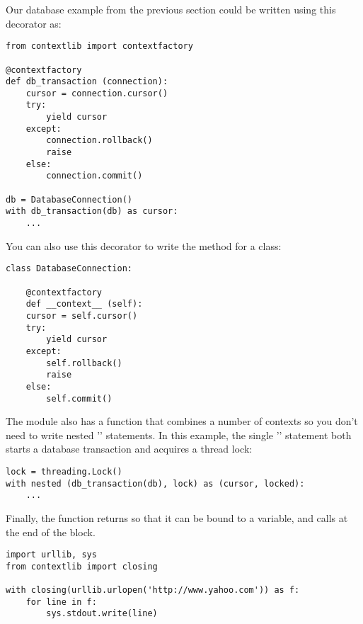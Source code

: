 \documentclass{howto}
\begin{document}
Our database example from the previous section could be written 
using this decorator as:

\begin{verbatim}
from contextlib import contextfactory

@contextfactory
def db_transaction (connection):
    cursor = connection.cursor()
    try:
        yield cursor
    except:
        connection.rollback()
        raise
    else:
        connection.commit()

db = DatabaseConnection()
with db_transaction(db) as cursor:
    ...
\end{verbatim}

You can also use this decorator to write the 
method for a class:

\begin{verbatim}
class DatabaseConnection:

    @contextfactory
    def __context__ (self):
	cursor = self.cursor()
	try:
	    yield cursor
	except:
	    self.rollback()
	    raise
	else:
	    self.commit()
\end{verbatim}


The  module also has a  function that combines a number of contexts so you
don't need to write nested '' statements.  In this
example, the single '' statement both starts a database
transaction and acquires a thread lock:

\begin{verbatim}
lock = threading.Lock()
with nested (db_transaction(db), lock) as (cursor, locked):
    ...
\end{verbatim}

Finally, the  function
returns  so that it can be bound to a variable,
and calls  at the end of the block.

\begin{verbatim}
import urllib, sys
from contextlib import closing

with closing(urllib.urlopen('http://www.yahoo.com')) as f:
    for line in f:
        sys.stdout.write(line)
\end{verbatim}

\begin{seealso}



\end{seealso}
\end{document}
